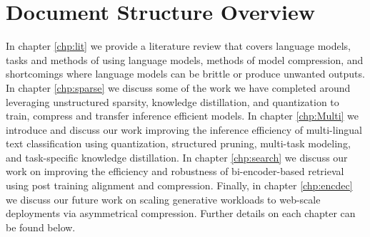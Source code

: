 \section{Document Structure Overview}
In chapter \ref{chp:lit} we provide a literature review that covers language models, tasks and methods of using language models, methods of model compression, and shortcomings where language models can be brittle or produce unwanted outputs. In chapter \ref{chp:sparse} we discuss some of the work we have completed around leveraging unstructured sparsity, knowledge distillation, and quantization to train, compress and transfer inference efficient models. In chapter \ref{chp:Multi} we introduce and discuss our work improving the inference efficiency of multi-lingual text classification using quantization, structured pruning, multi-task modeling, and task-specific knowledge distillation. In chapter \ref{chp:search} we discuss our work on improving the efficiency and robustness of bi-encoder-based retrieval using post training alignment and compression. Finally, in chapter \ref{chp:encdec} we discuss our future work on scaling generative workloads to web-scale deployments via asymmetrical compression. Further details on each chapter can be found below. 